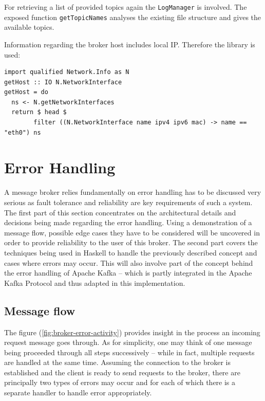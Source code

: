 For retrieving a list of provided topics again the \lstinline{LogManager} is
involved. The exposed function \lstinline{getTopicNames} analyses the existing
file structure and gives the available topics.

Information regarding the broker host includes local IP. Therefore the library
 is used: 

\begin{lstlisting}
import qualified Network.Info as N
getHost :: IO N.NetworkInterface
getHost = do
  ns <- N.getNetworkInterfaces
  return $ head $ 
        filter ((N.NetworkInterface name ipv4 ipv6 mac) -> name == "eth0") ns
\end{lstlisting}

\newpage
\section{Error Handling}
\label{sec:broker-error-handling}

A message broker relies fundamentally on error handling has to be discussed very
serious as fault tolerance and reliability are key requirements of such a
system. The first part of this section concentrates on the architectural details
and decisions being made regarding the error handling. Using a demonstration of
a message flow, possible edge cases they have to be considered will be uncovered
in order to provide reliability to the user of this broker. The second part
covers the techniques being used in Haskell to handle the previously described
concept and cases where errors may occur. This will also involve part of the
concept behind the error handling of Apache Kafka -- which is partly integrated
in the Apache Kafka Protocol and thus adapted in this implementation.

\subsection{Message flow}

The figure (\ref{fig:broker-error-activity}) provides insight in the process an
incoming request message goes through. As for simplicity, one may think of one
message being proceeded through all steps successively -- while in fact,
multiple requests are handled at the same time. Assuming the connection to the
broker is established and the client is ready to send requests to the broker,
there are principally two types of errors may occur and for each of which there
is a separate handler to handle error appropriately.

